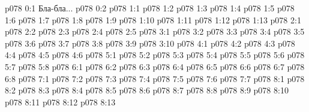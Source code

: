 \author{Архангел}
\vs p078 0:1  Бла-бла...
\vs p078 0:2 
\vs p078 1:1 
\vs p078 1:2 
\vs p078 1:3 
\vs p078 1:4 
\vs p078 1:5 
\vs p078 1:6 
\vs p078 1:7 
\vs p078 1:8 
\vs p078 1:9 
\vs p078 1:10 
\vs p078 1:11 
\vs p078 1:12 \pc 
\vs p078 1:13 
\vs p078 2:1 
\vs p078 2:2 
\vs p078 2:3 
\vs p078 2:4 
\vs p078 2:5 
\vs p078 3:1 
\vs p078 3:2 
\vs p078 3:3 
\vs p078 3:4 
\vs p078 3:5 \pc 
\vs p078 3:6 
\vs p078 3:7 
\vs p078 3:8 
\vs p078 3:9 \pc 
\vs p078 3:10 
\vs p078 4:1 
\vs p078 4:2 
\vs p078 4:3 
\vs p078 4:4 \pc 
\vs p078 4:5 \pc 
\vs p078 4:6 
\vs p078 5:1 
\vs p078 5:2 
\vs p078 5:3 
\vs p078 5:4 \pc 
\vs p078 5:5 \pc 
\vs p078 5:6 
\vs p078 5:7 
\vs p078 5:8 \pc 
{}
\vs p078 6:1 
\vs p078 6:2 
\vs p078 6:3 
\vs p078 6:4 
\vs p078 6:5 
\vs p078 6:6 \pc 
\vs p078 6:7 \pc 
\vs p078 6:8 
\vs p078 7:1 
\vs p078 7:2 
\vs p078 7:3 \pc 
\vs p078 7:4 
\vs p078 7:5 
\vs p078 7:6 \pc 
\vs p078 7:7 
\vs p078 8:1 
\vs p078 8:2 
\vs p078 8:3 \pc 
\vs p078 8:4 
\vs p078 8:5 
\vs p078 8:6 
\vs p078 8:7 
\vs p078 8:8 
\vs p078 8:9 
\vs p078 8:10 
\vs p078 8:11 
\vs p078 8:12 \pc 
\vsetoff
\vs p078 8:13 
\quizlink
